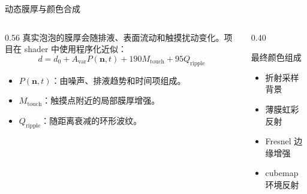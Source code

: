 \documentclass[11pt,aspectratio=169]{beamer}
\begin{document}
\begin{frame}{动态膜厚与颜色合成}
  \begin{columns}[T]
    \begin{column}{0.56\linewidth}
      真实泡泡的膜厚会随排液、表面流动和触摸扰动变化。项目在 shader 中使用程序化近似：
      \[
        d =
        d_0
        + A_{\mathrm{var}} P(\mathbf{n},t)
        + 190M_{\mathrm{touch}}
        + 95Q_{\mathrm{ripple}}
      \]
      \begin{itemize}
        \item \(P(\mathbf{n},t)\)：由噪声、排液趋势和时间项组成。
        \item \(M_{\mathrm{touch}}\)：触摸点附近的局部膜厚增强。
        \item \(Q_{\mathrm{ripple}}\)：随距离衰减的环形波纹。
      \end{itemize}
    \end{column}
    \begin{column}{0.40\linewidth}
      \begin{block}{最终颜色组成}
        \begin{itemize}
          \item 折射采样背景
          \item 薄膜虹彩反射
          \item Fresnel 边缘增强
          \item cubemap 环境反射
        \end{itemize}
      \end{block}
    \end{column}
  \end{columns}
\end{frame}
\end{document}
